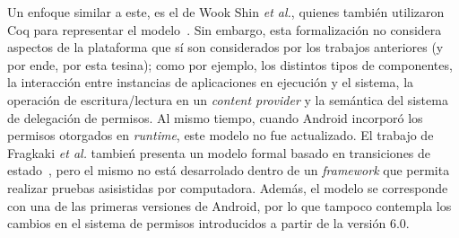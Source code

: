 Un enfoque similar a este, es el de Wook Shin \textit{et al.}, quienes también
utilizaron Coq para representar el modelo~\cite{shin}. Sin embargo, esta
formalización no considera aspectos de la plataforma que sí son considerados por
los trabajos anteriores (y por ende, por esta tesina); como por ejemplo, los
distintos tipos de componentes, la interacción entre instancias de aplicaciones
en ejecución y el sistema, la operación de escritura/lectura en un
\textit{content provider} y la semántica del sistema de delegación de permisos.
Al mismo tiempo, cuando Android incorporó los permisos otorgados en
\textit{runtime}, este modelo no fue actualizado. El trabajo de Fragkaki \textit{et al.}
tambień presenta un modelo formal basado en transiciones de
estado~\cite{fragkaki}, pero el mismo no está desarrolado dentro de un
\textit{framework} que permita realizar pruebas asisistidas por computadora.
Además, el modelo se corresponde con una de las primeras versiones de Android,
por lo que tampoco contempla los cambios en el sistema de permisos introducidos
a partir de la versión 6.0.